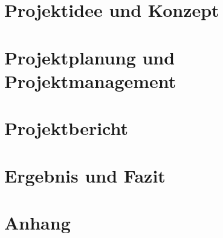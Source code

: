 \documentclass[a4paper, 12pt]{article}
\begin{document}
    

    \newpage
    \tableofcontents
    \newpage

    \section{Projektidee und Konzept}\label{sec:idee-konzept}
    
    \newpage


    \section{Projektplanung und Projektmanagement}\label{sec:planung-management}
    
    \newpage


    \section{Projektbericht}\label{sec:projektberichts}
    
    \newpage


    \section{Ergebnis und Fazit}\label{sec:ergebnis-fazit}
    
    \newpage

    \appendix


    \section{Anhang}\label{sec:anhang}
    
\end{document}
